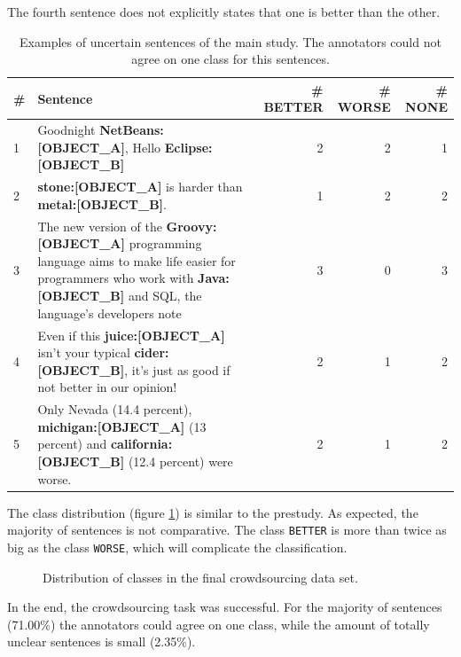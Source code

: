 The fourth sentence does not explicitly states that one is better than the other.
\begin{table}[h]
\centering
\caption{Examples of uncertain sentences of the main study. The annotators could not agree on one class for this sentences.}
\label{tbl:all_res}
\begin{tabularx}{\textwidth}{lXrrr}
\toprule
\# & Sentence        & \# BETTER  & \# WORSE & \# NONE            \\ \midrule
1 & Goodnight \textbf{{\color[HTML]{9A14B2}NetBeans:{[}OBJECT\_A{]}}}, Hello \textbf{{\color[HTML]{6CB219}Eclipse:{[}OBJECT\_B{]}}} & 2&2&1\\

2 & \textbf{{\color[HTML]{9A14B2}stone:{[}OBJECT\_A{]}}} is harder than \textbf{{\color[HTML]{6CB219}metal:{[}OBJECT\_B{]}}}. & 1 & 2 & 2 \\

3 & The new version of the \textbf{{\color[HTML]{9A14B2}Groovy:{[}OBJECT\_A{]}}} programming language aims to make life easier for programmers who work with \textbf{{\color[HTML]{6CB219}Java:{[}OBJECT\_B{]}}} and SQL, the language's developers note & 3 & 0 & 3 \\

4 & Even if this \textbf{{\color[HTML]{9A14B2}juice:{[}OBJECT\_A{]}}} isn't your typical \textbf{{\color[HTML]{6CB219}cider:{[}OBJECT\_B{]}}}, it's just as good if not better in our opinion! & 2 & 1 & 2 \\

5 & Only Nevada (14.4 percent), \textbf{{\color[HTML]{9A14B2}michigan:{[}OBJECT\_A{]}}}  (13 percent) and  \textbf{{\color[HTML]{6CB219}california:{[}OBJECT\_B{]}}} (12.4 percent) were worse. & 2 & 1 & 2\\
\bottomrule                              
\end{tabularx}
\end{table}


The class distribution (figure \ref{fig:all_fin}) is similar to the prestudy. As expected, the majority of sentences is not comparative. 
The class \texttt{BETTER} is more than twice as big as the class \texttt{WORSE}, which will complicate the classification.
\begin{figure}[h]
\centering
\caption{Distribution of classes in the final crowdsourcing data set.}
\label{fig:all_fin}
\end{figure}

In the end, the crowdsourcing task was successful. For the majority of sentences (71.00\%) the annotators could agree on one class, while the amount of totally unclear sentences is small (2.35\%).